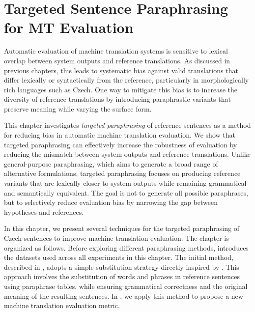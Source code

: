 \chapter{Targeted Sentence Paraphrasing for MT Evaluation}
\label{prehistory}
Automatic evaluation of machine translation systems is sensitive to lexical overlap between system outputs and reference translations. As discussed in previous chapters, this leads to systematic bias against valid translations that differ lexically or syntactically from the reference, particularly in morphologically rich languages such as Czech. One way to mitigate this bias is to increase the diversity of reference translations by introducing paraphrastic variants that preserve meaning while varying the surface form.

This chapter investigates \textit{targeted paraphrasing} of reference sentences as a method for reducing bias in automatic machine translation evaluation. We show that targeted paraphrasing can effectively increase the robustness of evaluation by reducing the mismatch between system outputs and reference translations. Unlike general-purpose paraphrasing, which aims to generate a broad range of alternative formulations, targeted paraphrasing focuses on producing reference variants that are lexically closer to system outputs while remaining grammatical and semantically equivalent. The goal is not to generate all possible paraphrases, but to selectively reduce evaluation bias by narrowing the gap between hypotheses and references.

In this chapter, we present several techniques for the targeted paraphrasing of Czech sentences to improve machine translation evaluation. The chapter is organized as follows. Before exploring different paraphrasing methods,  introduces the datasets used across all experiments in this chapter. The initial method, described in , adopts a simple substitution strategy directly inspired by \cite{kauchak}. This approach involves the substitution of words and phrases in reference sentences using paraphrase tables, while ensuring grammatical correctness and the original meaning of the resulting sentences. In , we apply this method to propose a new machine translation evaluation metric.

